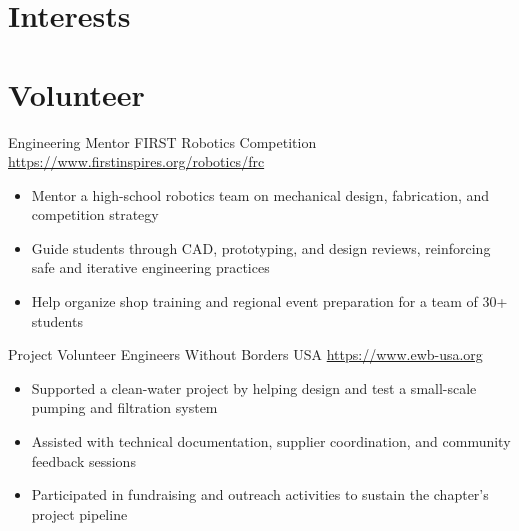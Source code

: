 \documentclass[a4paper, serif, 10pt]{moderncv}
\begin{document}
\section{Interests}

\section{Volunteer}

        {Engineering Mentor}
        {FIRST Robotics Competition}
        {\url{https://www.firstinspires.org/robotics/frc}}
        {}
        {\begin{itemize}
\item Mentor a high-school robotics team on mechanical design, fabrication, and competition strategy
\item Guide students through CAD, prototyping, and design reviews, reinforcing safe and iterative engineering practices
\item Help organize shop training and regional event preparation for a team of 30+ students
\end{itemize}}
    

        {Project Volunteer}
        {Engineers Without Borders USA}
        {\url{https://www.ewb-usa.org}}
        {}
        {\begin{itemize}
\item Supported a clean-water project by helping design and test a small-scale pumping and filtration system
\item Assisted with technical documentation, supplier coordination, and community feedback sessions
\item Participated in fundraising and outreach activities to sustain the chapter's project pipeline
\end{itemize}}
    
\end{document}
